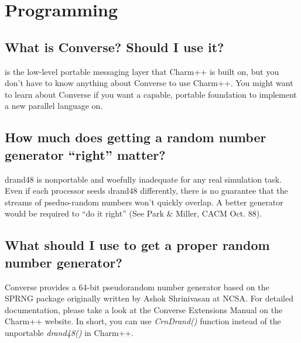 \section{\converse{} Programming}

\subsection{What is Converse? Should I use it?}

is the low-level portable messaging layer that Charm++ is built on, but
you don't have to know anything about Converse to use Charm++. You might
want to learn about Converse if you want a capable, portable foundation
to implement a new parallel language on.

\subsection{How much does getting a random number generator ``right'' matter?}

drand48 is nonportable and woefully inadequate for any real simulation
task. Even if each processor seeds drand48 differently, there is no guarantee
that the streams of pseduo-random numbers won't quickly overlap. A better
generator would be required to ``do it right'' (See Park \& Miller, CACM
Oct. 88).

\subsection{What should I use to get a proper random number generator?}

Converse provides a 64-bit pseudorandom number generator based on the
SPRNG package originally written by Ashok Shrinivasan at NCSA. For detailed
documentation, please take a look at the Converse Extensions Manual on
the Charm++ website. In short, you can use {\em CrnDrand()} function
instead of the unportable {\em drand48()} in Charm++.
